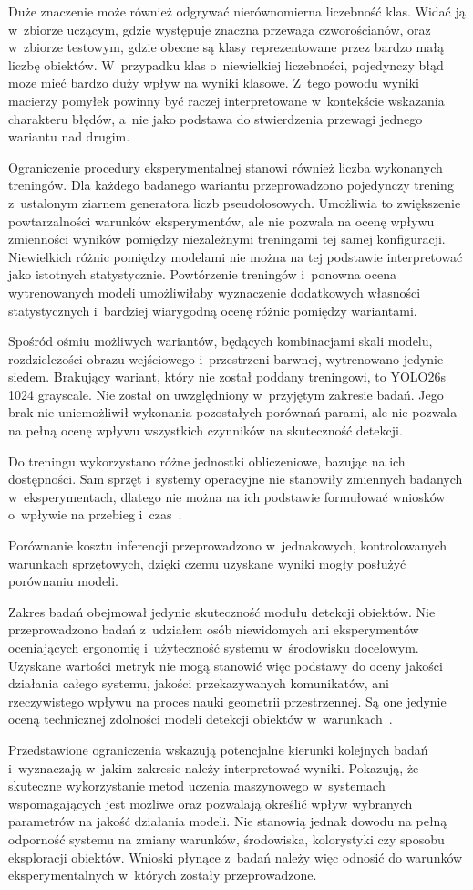 Duże znaczenie może również odgrywać nierównomierna liczebność klas. Widać ją w~zbiorze uczącym, gdzie występuje znaczna przewaga czworościanów, oraz w~zbiorze testowym, gdzie obecne są klasy reprezentowane przez bardzo małą liczbę obiektów. W~przypadku klas o~niewielkiej liczebności, pojedynczy błąd moze mieć bardzo duży wpływ na wyniki klasowe. Z~tego powodu wyniki macierzy pomyłek powinny być raczej interpretowane w~kontekście wskazania charakteru błędów, a~nie jako podstawa do stwierdzenia przewagi jednego wariantu nad drugim.

Ograniczenie procedury eksperymentalnej stanowi również liczba wykonanych treningów. Dla każdego badanego wariantu przeprowadzono pojedynczy trening z~ustalonym ziarnem generatora liczb pseudolosowych. Umożliwia to zwiększenie powtarzalności warunków eksperymentów, ale nie pozwala na ocenę wpływu zmienności wyników pomiędzy niezależnymi treningami tej samej konfiguracji. Niewielkich różnic pomiędzy modelami nie można na tej podstawie interpretować jako istotnych statystycznie. Powtórzenie treningów i~ponowna ocena wytrenowanych modeli umożliwiłaby wyznaczenie dodatkowych własności statystycznych i~bardziej wiarygodną ocenę różnic pomiędzy wariantami.

Spośród ośmiu możliwych wariantów, będących kombinacjami skali modelu, rozdzielczości obrazu wejściowego i~przestrzeni barwnej, wytrenowano jedynie siedem. Brakujący wariant, który nie został poddany treningowi, to YOLO26s 1024 grayscale. Nie został on uwzględniony w~przyjętym zakresie badań. Jego brak nie uniemożliwił wykonania pozostałych porównań parami, ale nie pozwala na pełną ocenę wpływu wszystkich czynników na skuteczność detekcji.

Do treningu wykorzystano różne jednostki obliczeniowe, bazując na ich dostępności. Sam sprzęt i~systemy operacyjne nie stanowiły zmiennych badanych w~eksperymentach, dlatego nie można na ich podstawie formułować wniosków o~wpływie na przebieg i~czas~.

Porównanie kosztu inferencji przeprowadzono w~jednakowych, kontrolowanych warunkach sprzętowych, dzięki czemu uzyskane wyniki mogły posłużyć porównaniu modeli.

Zakres badań obejmował jedynie skuteczność modułu detekcji obiektów. Nie przeprowadzono badań z~udziałem osób niewidomych ani eksperymentów oceniających ergonomię i~użyteczność systemu w~środowisku docelowym. Uzyskane wartości metryk nie mogą stanowić więc podstawy do oceny jakości działania całego systemu, jakości przekazywanych komunikatów, ani rzeczywistego wpływu na proces nauki geometrii przestrzennej. Są one jedynie oceną technicznej zdolności modeli detekcji obiektów w~warunkach~.

Przedstawione ograniczenia wskazują potencjalne kierunki kolejnych badań i~wyznaczają w~jakim zakresie należy interpretować wyniki. Pokazują, że skuteczne wykorzystanie metod uczenia maszynowego w~systemach wspomagających jest możliwe oraz pozwalają określić wpływ wybranych parametrów na jakość działania modeli. Nie stanowią jednak dowodu na pełną odporność systemu na zmiany warunków, środowiska, kolorystyki czy sposobu eksploracji obiektów. Wnioski płynące z~badań należy więc odnosić do warunków eksperymentalnych w~których zostały przeprowadzone.